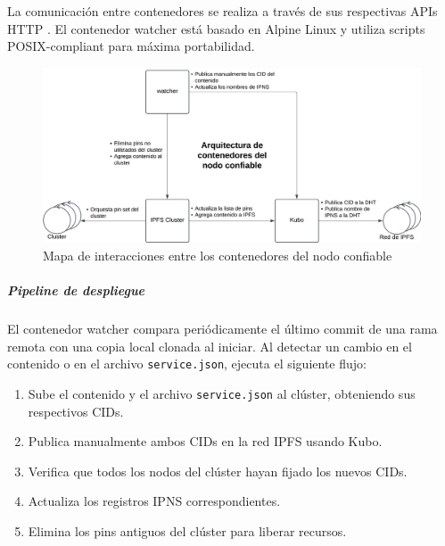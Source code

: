 La comunicación entre contenedores se realiza a través de sus respectivas APIs HTTP \cite{kubo-api} \cite{cluster-api}. El contenedor watcher está basado en Alpine Linux y utiliza scripts POSIX-compliant para máxima portabilidad.

\begin{figure}[H]
    \centering
    \includegraphics[width=1\linewidth]{img/solucion-ipfs/contenedores-trusted-peer.png}
    \caption{Mapa de interacciones entre los contenedores del nodo confiable}
    \label{fig:contenedores-trusted-peer}
\end{figure}

\subparagraph{Pipeline de despliegue} El contenedor watcher compara periódicamente el último commit de una rama remota con una copia local clonada al iniciar. Al detectar un cambio en el contenido o en el archivo \texttt{service.json}, ejecuta el siguiente flujo:
\begin{enumerate}
    \item Sube el contenido y el archivo \texttt{service.json} al clúster, obteniendo sus respectivos CIDs.
    \item Publica manualmente ambos CIDs en la red IPFS usando Kubo.
    \item Verifica que todos los nodos del clúster hayan fijado los nuevos CIDs.
    \item Actualiza los registros IPNS correspondientes.
    \item Elimina los pins antiguos del clúster para liberar recursos.
\end{enumerate}

